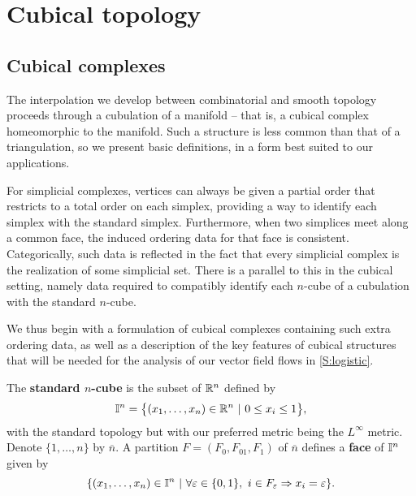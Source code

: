 
\section{Cubical topology}\label{S:cubical topology}

\subsection{Cubical complexes}\label{cubicalcomplexes}

The interpolation we develop between combinatorial and smooth topology proceeds through a cubulation of a manifold -- that is, a cubical complex homeomorphic to the manifold.
Such a structure is less common than that of a triangulation, so we present basic definitions, in a form best suited to our applications.

For simplicial complexes, vertices can always be given a partial order that restricts to a total order on each simplex, providing a way to identify each simplex with the standard simplex.
Furthermore, when two simplices meet along a common face, the induced ordering data for that face is consistent.
Categorically, such data is reflected in the fact that every simplicial complex is the realization of some simplicial set.
There is a parallel to this in the cubical setting, namely data required to compatibly identify each $n$-cube of a cubulation with the standard $n$-cube.

We thus begin with a formulation of cubical complexes containing such extra ordering data, as well as a description of the key features of cubical structures that will be needed for the analysis of our vector field flows in \cref{S:logistic}.

The \textbf{standard $n$-cube} is the subset of $\mathbb{R}^n$ defined by
\begin{equation*}
	\mathbb{I}^n = \big\{ (x_1, \dots, x_n) \in \mathbb{R}^n\ |\ 0 \leq x_i \leq 1 \big\},
\end{equation*}
with the standard topology but with our preferred metric being the $L^\infty$ metric.
Denote $\{1, \dots, n\}$ by $\overline{n}$.
A partition $F = (F_0, F_{01}, F_1)$ of $\overline n$ defines a \textbf{face} of $\mathbb{I}^n$ given by
\begin{equation*}
	\{(x_1, \dots, x_n) \in \mathbb{I}^n\ |\ \forall \varepsilon \in \{0, 1\},\ i \in F_\varepsilon \Rightarrow x_i = \varepsilon\}.
\end{equation*}

